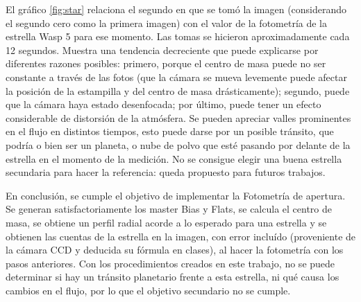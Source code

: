 \documentclass[a4paper, 11pt, spanish]{article}
\begin{document}
El gr\'afico \ref{fig:star} relaciona el segundo en que se tom\'o la imagen (considerando el segundo cero como la primera imagen) con el valor de la fotometr\'ia de la estrella Wasp 5 para ese momento. Las tomas se hicieron aproximadamente cada 12 segundos. Muestra una tendencia decreciente que puede explicarse por diferentes razones posibles: primero, porque el centro de masa puede no ser constante a trav\'es de las fotos (que la c\'amara se mueva levemente puede afectar la posici\'on de la estampilla y del centro de masa dr\'asticamente); segundo, puede que la c\'amara haya estado desenfocada; por \'ultimo, puede tener un efecto considerable de distorsi\'on de la atm\'osfera. Se pueden apreciar valles prominentes en el flujo en distintos tiempos, esto puede darse por un posible tr\'ansito, que podr\'ia o bien ser un planeta, o nube de polvo que est\'e pasando por delante de la estrella en el momento de la medici\'on.
No se consigue elegir una buena estrella secundaria para hacer la referencia: queda propuesto para futuros trabajos.

En conclusi\'on, se cumple el objetivo de implementar la Fotometr\'ia de apertura. Se generan satisfactoriamente los master  Bias y Flats, se calcula el centro de masa, se obtiene un perfil radial acorde a lo esperado para una estrella y se obtienen las cuentas de la estrella en la imagen, con error inclu\'ido (proveniente de la c\'amara CCD y deducida su f\'ormula en clases), al hacer la fotometr\'ia con los pasos anteriores. Con los procedimientos creados en este trabajo, no se puede determinar si hay un tr\'ansito planetario frente a esta estrella, ni qu\'e causa los cambios en el flujo, por lo que el objetivo secundario no se cumple. 
\end{document}
